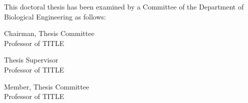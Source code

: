 \begin{titlepage}
\begin{large}
This doctoral thesis has been examined by a Committee of the Department
of Biological Engineering as follows:

\signature{CHAIR NAME}{Chairman, Thesis Committee \\
   Professor of TITLE}

\signature{ADVISOR NAME}{Thesis Supervisor \\
   Professor of TITLE}

\signature{MEMBER NAME}{Member, Thesis Committee \\
   Professor of TITLE}
\end{large}
\end{titlepage}


